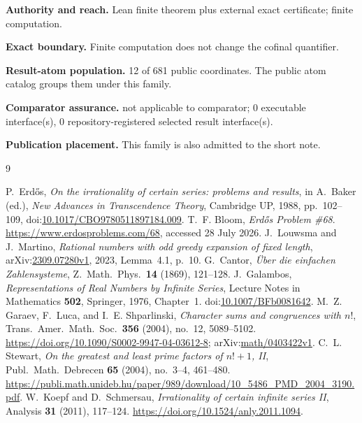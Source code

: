\documentclass[11pt]{article}
\begin{document}
\textbf{Authority and reach.} Lean finite theorem plus external exact certificate; finite computation.

\textbf{Exact boundary.} Finite computation does not change the cofinal quantifier.

\textbf{Result-atom population.} 12 of 681 public coordinates. The public atom catalog groups them under this family.

\textbf{Comparator assurance.} not applicable to comparator; 0 executable interface(s), 0 repository-registered selected result interface(s).

\textbf{Publication placement.} This family is also admitted to the short note.
\begin{thebibliography}{9}
\small
\raggedright
\setlength{\itemsep}{0pt}
 P.~Erd\H{o}s, \emph{On the irrationality of certain series:
  problems and results}, in A.~Baker (ed.), \emph{New Advances in Transcendence
  Theory}, Cambridge UP, 1988, pp.~102--109,
  doi:\href{https://doi.org/10.1017/CBO9780511897184.009}
  {10.1017/CBO9780511897184.009}.
 T.~F. Bloom, \emph{Erd\H{o}s Problem \#68}.
  \url{https://www.erdosproblems.com/68}, accessed 28 July 2026.
  J.~Louwsma and J.~Martino,
  \emph{Rational numbers with odd greedy expansion of fixed length},
  arXiv:\href{https://arxiv.org/abs/2309.07280v1}{2309.07280v1}, 2023,
  Lemma~4.1, p.~10.
  G.~Cantor,
  \emph{\"Uber die einfachen Zahlensysteme},
  Z.\ Math.\ Phys.\ \textbf{14} (1869), 121--128.
  J.~Galambos,
  \emph{Representations of Real Numbers by Infinite Series},
  Lecture Notes in Mathematics \textbf{502}, Springer, 1976, Chapter~1.
  doi:\href{https://doi.org/10.1007/BFb0081642}{10.1007/BFb0081642}.
  M.~Z. Garaev, F.~Luca, and I.~E. Shparlinski,
  \emph{Character sums and congruences with $n!$},
  Trans.\ Amer.\ Math.\ Soc.\ \textbf{356} (2004), no.~12, 5089--5102.
  \url{https://doi.org/10.1090/S0002-9947-04-03612-8};
  arXiv:\href{https://arxiv.org/abs/math/0403422}{math/0403422v1}.
  C.~L. Stewart,
  \emph{On the greatest and least prime factors of $n!+1$, II},
  Publ.\ Math.\ Debrecen \textbf{65} (2004), no.~3--4, 461--480.
  \url{https://publi.math.unideb.hu/paper/989/download/10_5486_PMD_2004_3190.pdf}.
  W.~Koepf and D.~Schmersau,
  \emph{Irrationality of certain infinite series II},
  Analysis \textbf{31} (2011), 117--124.
  \url{https://doi.org/10.1524/anly.2011.1094}.

\end{thebibliography}
\end{document}
